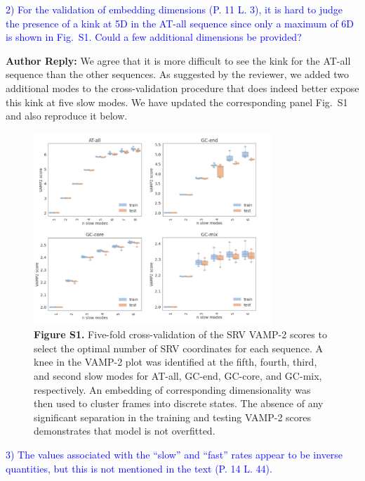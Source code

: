 \documentclass[11pt,a4paper]{letter} %
\begin{document}
\textcolor{blue}{2)      For the validation of embedding dimensions (P. 11 L. 3), it is hard to judge the presence of a kink at 5D in the AT-all sequence since only a maximum of 6D is shown in Fig.~S1. Could a few additional dimensions be provided?}

\textbf{Author Reply:}   We agree that it is more difficult to see the kink for the AT-all sequence than the other sequences. As suggested by the reviewer, we added two additional modes to the cross-validation procedure that does indeed better expose this kink at five slow modes. We have updated the corresponding panel Fig.~S1 and also reproduce it below.

\begin{figure}[ht!]
	\begin{center}
        \includegraphics[width=0.8\textwidth]{../FigS1.pdf}
         \caption*{\textbf{Figure S1.} Five-fold cross-validation of the SRV VAMP-2 scores to select the optimal number of SRV coordinates for each sequence. A knee in the VAMP-2 plot was identified at the fifth, fourth, third, and second slow modes for AT-all, GC-end, GC-core, and GC-mix, respectively. An embedding of corresponding dimensionality was then used to cluster frames into discrete states. The absence of any significant separation in the training and testing VAMP-2 scores demonstrates that model is not overfitted.}
        \label{fig:SIFig1}
	\end{center}
\end{figure}



\textcolor{blue}{3)      The values associated with the ``slow'' and ``fast'' rates appear to be inverse quantities, but this is not mentioned in the text (P. 14 L. 44).}
\end{document}
